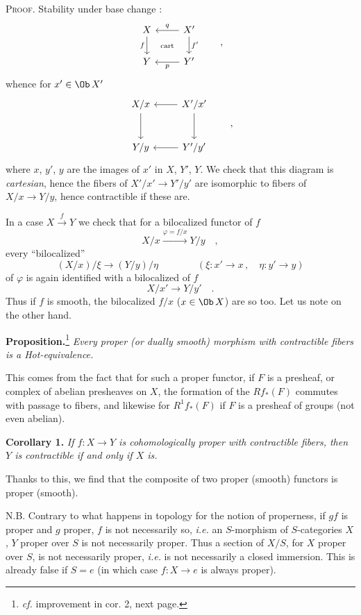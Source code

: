 
\noindent{}
\textsc{Proof}. Stability under base change :
\[
\begin{tikzcd}
X \arrow[d, "f"'] \arrow[dr, phantom, "\text{\scriptsize cart}"] & X' \arrow[l, "q"'] \arrow[d, "f'"] \\
Y & Y' \arrow[l, "p"]
\end{tikzcd}
\qquad ,
\]
whence for $x' \in \Ob\, X'$
\[
\begin{tikzcd}[row sep=large]
X/x \arrow[d] & X'/x' \arrow[l] \arrow[d] \\
Y/y & Y'/y' \arrow[l]
\end{tikzcd}
\qquad ,
\]
where $x$, $y'$, $y$ are the images of $x'$ in $X$, $Y'$, $Y$. We check that this diagram is \textit{cartesian}, hence the fibers of $X'/x' \longrightarrow Y'/y'$ are isomorphic to fibers of $X/x \longrightarrow Y/y$, hence contractible if these are.

In a case $X \xrightarrow{f} Y$ we check that for a bilocalized functor of $f$
\[
X/x \xrightarrow{\varphi=f/x} Y/y \quad ,
\]
every ``bilocalized''
\[
(X/x)/\xi \longrightarrow (Y/y)/\eta \qquad\qquad (\xi : x' \to x\,, \quad \eta : y' \to y)
\]
of $\varphi$ is again identified with a bilocalized of $f$
\[
X/x' \longrightarrow Y/y' \quad .
\]
Thus if $f$ is smooth, the bilocalized $f/x$ ($x \in \Ob\, X$) are so too. Let us note on the other hand.

\noindent\textbf{Proposition.}\footnote[24]{\textit{cf.} improvement in cor. 2, next page.} \textit{Every proper (or dually smooth) morphism with contractible fibers is a Hot-equivalence.}

\noindent{}
This comes from the fact that for such a proper functor, if $F$ is a presheaf, or complex of abelian presheaves on $X$, the formation of the $Rf_*(F)$ commutes with passage to fibers, and likewise for $R^1f_*(F)$ if $F$ is a presheaf of groups (not even abelian).

\noindent\textbf{Corollary 1.} \textit{If $f : X \to Y$ is cohomologically proper with contractible fibers, then $Y$ is contractible if and only if $X$ is.}

Thanks to this, we find that the composite of two proper (smooth) functors is proper (smooth).


\noindent N.B. Contrary to what happens in topology for the notion of properness, if $gf$ is proper and $g$ proper, $f$ is not necessarily so, \textit{i.e.} an $S$-morphism of $S$-categories $X$, $Y$ proper over $S$ is not necessarily proper. Thus a section of $X/S$, for $X$ proper over $S$, is not necessarily proper, \textit{i.e.} is not necessarily a closed immersion. This is already false if $S = e$ (in which case $f : X \to e$ is always proper).

